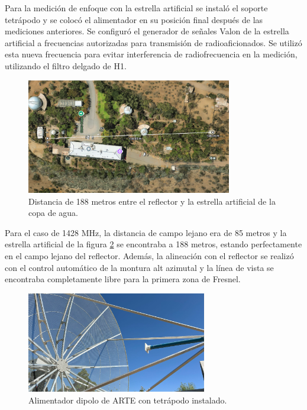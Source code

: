 Para la medición de enfoque con la estrella artificial se instaló el soporte tetrápodo y se colocó el alimentador en su posición final después de las mediciones anteriores. Se configuró el generador de señales Valon de la estrella artificial a frecuencias autorizadas para transmisión de radioaficionados. Se utilizó esta nueva frecuencia para evitar interferencia de radiofrecuencia en la medición, utilizando el filtro delgado de H1.\\

\begin{figure}
    \centering
    \includegraphics[width=0.8\textwidth]{img/188m_measure}
    \caption{Distancia de 188 metros entre el reflector y la estrella artificial de la copa de agua.}
    \label{fig:enfoque2}
\end{figure}

Para el caso de 1428 MHz, la distancia de campo lejano era de 85 metros y la estrella artificial de la figura \ref{fig:enfoque2} se encontraba a 188 metros, estando perfectamente en el campo lejano del reflector. Además, la alineación con el reflector se realizó con el control automático de la montura alt azimutal y la línea de vista se encontraba completamente libre para la primera zona de Fresnel.\\

\begin{figure}
    \centering
    \includegraphics[width=0.7\textwidth]{img/feed_focus}
    \caption{Alimentador dipolo de ARTE con tetrápodo instalado.}
    \label{fig:enfoque2}
\end{figure}

